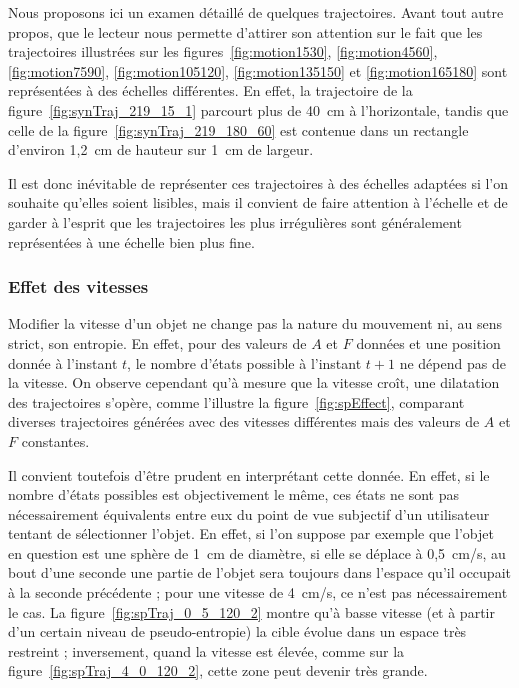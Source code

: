 	Nous proposons ici un examen détaillé de quelques trajectoires. Avant tout autre propos, que le lecteur nous permette d'attirer son attention sur le fait que les trajectoires illustrées sur les figures~\ref{fig:motion1530}, \ref{fig:motion4560}, \ref{fig:motion7590}, \ref{fig:motion105120}, \ref{fig:motion135150} et \ref{fig:motion165180} sont représentées à des échelles différentes. En effet, la trajectoire de la figure~\ref{fig:synTraj_219_15_1} parcourt plus de 40~cm à l'horizontale, tandis que celle de la figure~\ref{fig:synTraj_219_180_60} est contenue dans un rectangle d'environ 1,2~cm de hauteur sur 1~cm de largeur.
	
	Il est donc inévitable de représenter ces trajectoires à des échelles adaptées si l'on souhaite qu'elles soient lisibles, mais il convient de faire attention à l'échelle et de garder à l'esprit que les trajectoires les plus irrégulières sont généralement représentées à une échelle bien plus fine.
	
	\FloatBarrier \subsubsection{Effet des vitesses}
	Modifier la vitesse d'un objet ne change pas la \og nature \fg{} du mouvement ni, au sens strict, son entropie. En effet, pour des valeurs de $A$ et $F$ données et une position donnée à l'instant $t$, le nombre d'états possible à l'instant $t+1$ ne dépend pas de la vitesse. On observe cependant qu'à mesure que la vitesse croît, une \og dilatation \fg{} des trajectoires s'opère, comme l'illustre la figure~\ref{fig:spEffect}, comparant diverses trajectoires générées avec des vitesses différentes mais des valeurs de $A$ et $F$ constantes.
	
	Il convient toutefois d'être prudent en interprétant cette donnée. En effet, si le nombre d'états possibles est objectivement le même, ces états ne sont pas nécessairement équivalents entre eux du point de vue subjectif d'un utilisateur tentant de sélectionner l'objet. En effet, si l'on suppose par exemple que l'objet en question est une sphère de 1~cm de diamètre, si elle se déplace à 0,5~cm/s, au bout d'une seconde une partie de l'objet sera toujours dans l'espace qu'il occupait à la seconde précédente ; pour une vitesse de 4~cm/s, ce n'est pas nécessairement le cas. La figure~\ref{fig:spTraj_0_5_120_2} montre qu'à basse vitesse (et à partir d'un certain niveau de pseudo-entropie) la cible évolue dans un espace très restreint ; inversement, quand la vitesse est élevée, comme sur la figure~\ref{fig:spTraj_4_0_120_2}, cette zone peut devenir très grande.
	
